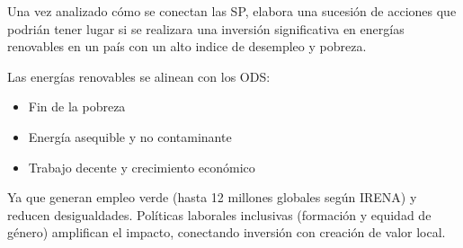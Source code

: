 

%
%
%



\clearpage
{}
Una vez analizado cómo se conectan las SP,  elabora
una sucesión de acciones que podrián tener lugar si se realizara una inversión significativa en energías renovables en un país 
con un alto indice de desempleo y pobreza.


Las energías renovables se alinean con los ODS: 
\begin{itemize}
	\item  {} Fin de la pobreza
	\item  {} Energía asequible y no contaminante
	\item  {} Trabajo decente y crecimiento económico
\end{itemize}
Ya que generan empleo verde (hasta 12 millones globales según IRENA) y reducen desigualdades. 
Políticas laborales inclusivas (formación y equidad de género) amplifican el impacto, conectando 
inversión con creación de valor local.

